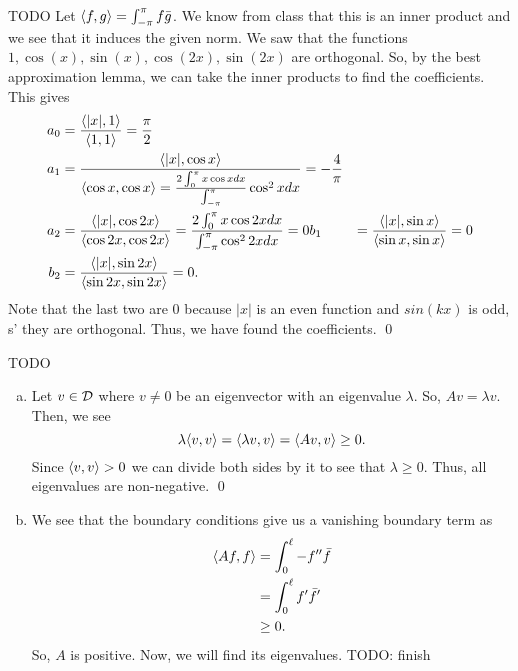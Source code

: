 \documentclass{article}
\begin{document}
\newpage
{} TODO
 \tri
\hop 
\solution
Let $\ang{f,g} = \int_{-\pi}^\pi f\bar{g}$. We know from class that this is an inner product and we see that it induces the given norm. We saw that the functions $1, \cos(x), \sin(x), \cos(2x), \sin(2x)$ are orthogonal. So, by the best approximation lemma, we can take the inner products to find the coefficients. This gives 
\begin{align*}
    a_0 &= \frac{\ang{|x|, 1}}{\ang{1,1}} = \frac{\pi}{2}\\
    a_1 &= \frac{\ang{|x|, \cos x}}{\ang{\cos x, \cos x} = \frac{2\int_0^\pi x \cos x dx}{\int_{-\pi}^\pi}\cos^2 x dx} = -\frac{4}{\pi} \\
    a_2 &= \frac{\ang{|x|, \cos 2x}}{\ang{\cos 2x, \cos 2x}} = \frac{2\int_0^\pi x \cos 2x dx}{\int_{-\pi}^\pi\cos^2 2x dx} = 0
    b_1 &= \frac{\ang{|x|, \sin x}}{\ang{\sin x, \sin x}} = 0 \\
    b_2&= \frac{\ang{|x|, \sin 2x}}{\ang{\sin 2x, \sin 2x}} = 0.
\end{align*}
Note that the last two are 0 because $|x|$ is an even function and $sin(kx)$ is odd, s' they are orthogonal. Thus, we have found the coefficients. \qed


\newpage
{} TODO
 \tri
\hop 
\solution
\begin{enumerate}[(a)]
    \item Let $v \in \cal{D}$ where $v \ne 0$ be an eigenvector with an eigenvalue $\lambda$. So, $Av = \lambda v$. Then, we see 
    \[\lambda \ang{v,v} = \ang{\lambda v, v} = \ang{Av, v} \ge 0.\]
    Since $\ang{v,v} >0$ we can divide both sides by it to see that $\lambda \ge 0$. Thus, all eigenvalues are non-negative. \qed
    \item We see that the boundary conditions give us a vanishing boundary term as 
    \begin{align*}
        \ang{Af, f} &= \int_0^\ell -f''\bar{f} \\
        &=  \int_0^\ell f'\bar{f}'\\
        &\ge 0.
    \end{align*}
    So, $A$ is positive. 
    \hop
    Now, we will find its eigenvalues.
    TODO: finish 
\end{enumerate}
\end{document}
